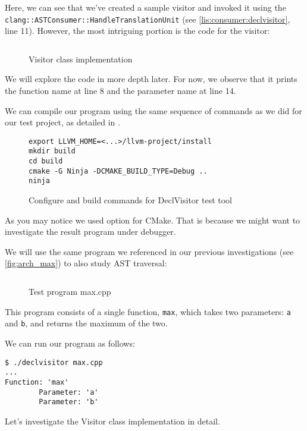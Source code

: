 Here, we can see that we've created a sample visitor and invoked it using the \\
\texttt{clang::ASTConsumer::HandleTranslationUnit} (see
\cref{lis:consumer:declvisitor}, line 11). However, the most
intriguing portion is the code for the visitor: 
\begin{figure}[H]
  \inputminted[highlightlines={8,14}]{c++}{src/part1/ch3_ast/declvisitor/Visitor.hpp}
  \caption{Visitor class implementation}
  \label{lis:declvisitor:visitor}
\end{figure}
We will explore the code in more depth later. For now, we observe that it prints
the function name at line 8 and the parameter name at line 14. 

We can compile our program using the same sequence of commands as we did for our
test project, as detailed in . 
\begin{figure}[H]
\begin{adjustwidth}{0em}{0em}
\begin{verbatim}
export LLVM_HOME=<...>/llvm-project/install
mkdir build
cd build
cmake -G Ninja -DCMAKE_BUILD_TYPE=Debug ..
ninja
\end{verbatim}
\end{adjustwidth}
\caption{Configure and build commands for DeclVisitor test tool}
\label{lis:declvisitor:cmakeconfig}
\end{figure}
As you may notice we used  option
for CMake. That is because we might want to investigate the result program under
debugger.

We will use the same program we referenced in our previous investigations (see \cref{fig:arch_max}) to also study AST traversal:
\begin{figure}[H]
\inputminted{c++}{./src/part1/ch2_arch/max.cpp}
\caption{Test program max.cpp}
\label{lis:declvisitor:max}
\end{figure}
This program consists of a single function, \texttt{max}, which takes
two parameters: \texttt{a} and \texttt{b}, and returns the
maximum of the two. 

We can run our program as follows:
\begin{adjustwidth}{0em}{0em}
\begin{verbatim}
$ ./declvisitor max.cpp 
...
Function: 'max'
        Parameter: 'a'
        Parameter: 'b'
\end{verbatim}
\end{adjustwidth}
Let's investigate the Visitor class implementation in detail.

